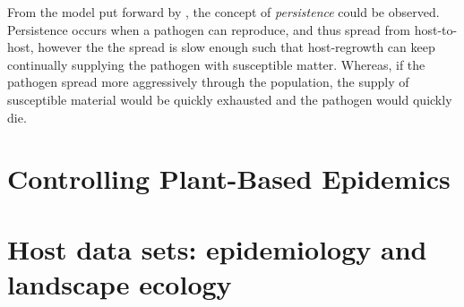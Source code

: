 From the model put forward by \cite{park2001invasion}, the concept of \textit{persistence} could be observed. Persistence occurs when a pathogen can reproduce, and thus spread from host-to-host, however the the spread is slow enough such that host-regrowth can keep continually supplying the pathogen with susceptible matter. Whereas, if the pathogen spread more aggressively through the population, the supply of susceptible material would be quickly exhausted and the pathogen would quickly die.


\section{Controlling Plant-Based Epidemics}

\blindtext



\section{Host data sets: epidemiology and landscape ecology}

